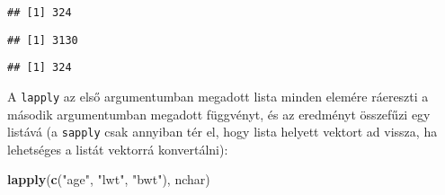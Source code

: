 \documentclass[]{book}
\newenvironment{Shaded}{\begin{snugshade}}{\end{snugshade}}
\newcommand{\KeywordTok}[1]{\textcolor[rgb]{0.13,0.29,0.53}{\textbf{#1}}}
\newcommand{\DataTypeTok}[1]{\textcolor[rgb]{0.13,0.29,0.53}{#1}}
\newcommand{\DecValTok}[1]{\textcolor[rgb]{0.00,0.00,0.81}{#1}}
\newcommand{\StringTok}[1]{\textcolor[rgb]{0.31,0.60,0.02}{#1}}
\newcommand{\ControlFlowTok}[1]{\textcolor[rgb]{0.13,0.29,0.53}{\textbf{#1}}}
\newcommand{\OperatorTok}[1]{\textcolor[rgb]{0.81,0.36,0.00}{\textbf{#1}}}
\newcommand{\NormalTok}[1]{#1}
\begin{document}
\begin{Shaded}
\end{Shaded}

\begin{verbatim}
## [1] 324
\end{verbatim}

\begin{Shaded}
\end{Shaded}

\begin{verbatim}
## [1] 3130
\end{verbatim}

\begin{Shaded}
\end{Shaded}

\begin{verbatim}
## [1] 324
\end{verbatim}

A \texttt{lapply} az első argumentumban megadott lista minden elemére
ráereszti a második argumentumban megadott függvényt, és az eredményt
összefűzi egy listává (a \texttt{sapply} csak annyiban tér el, hogy
lista helyett vektort ad vissza, ha lehetséges a listát vektorrá
konvertálni):

\begin{Shaded}
\begin{Highlighting}[]
\KeywordTok{lapply}\NormalTok{(}\KeywordTok{c}\NormalTok{(}\StringTok{"age"}\NormalTok{, }\StringTok{"lwt"}\NormalTok{, }\StringTok{"bwt"}\NormalTok{), nchar)}
\end{Highlighting}
\end{Shaded}
\end{document}
